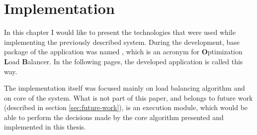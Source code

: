 \chapter{Implementation}\label{ch:implementation}
In this chapter I would like to present the technologies that were used while implementing the previously described system.
During the development,
base package of the application was named ,
which is an acronym for \textbf{O}ptimization \textbf{L}oad \textbf{B}alancer.
In the following pages, 
the developed application is called this way.

The implementation itself was focused mainly on load balancing algorithm 
and on core of the system.
What is not part of this paper,
and belongs to future work (described in section \ref{sec:future-work}),
is an execution module, 
which would be able to perform the decisions made by the core algorithm presented 
and implemented in this thesis.







